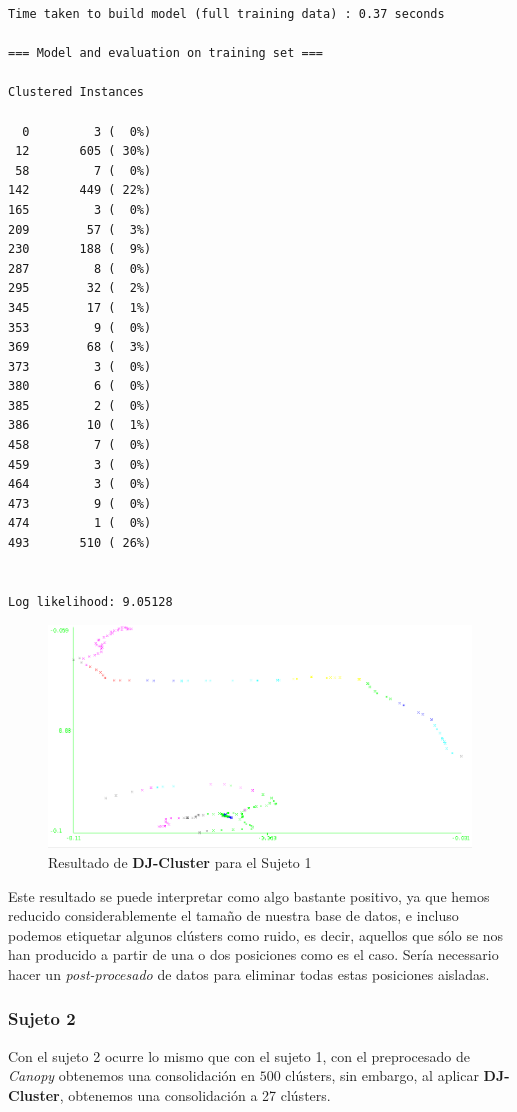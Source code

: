 \documentclass[a4paper, 12pt, spanish]{article}
\begin{document}
\begin{verbatim}
Time taken to build model (full training data) : 0.37 seconds

=== Model and evaluation on training set ===

Clustered Instances

  0         3 (  0%)
 12       605 ( 30%)
 58         7 (  0%)
142       449 ( 22%)
165         3 (  0%)
209        57 (  3%)
230       188 (  9%)
287         8 (  0%)
295        32 (  2%)
345        17 (  1%)
353         9 (  0%)
369        68 (  3%)
373         3 (  0%)
380         6 (  0%)
385         2 (  0%)
386        10 (  1%)
458         7 (  0%)
459         3 (  0%)
464         3 (  0%)
473         9 (  0%)
474         1 (  0%)
493       510 ( 26%)


Log likelihood: 9.05128
\end{verbatim}


\begin{figure}[H]
	\includegraphics[scale=.5]{../comparativa/djClusterSujeto1.png}
	\caption{Resultado de \textbf{DJ-Cluster} para el Sujeto 1}
\end{figure}

Este resultado se puede interpretar como algo bastante positivo, ya que hemos reducido considerablemente el tama\~no de nuestra base de datos, e incluso podemos etiquetar algunos cl\'usters como ruido, es decir, aquellos que s\'olo se nos han producido a partir de una o dos posiciones como es el caso. Ser\'ia necessario hacer un \textit{post-procesado} de datos para eliminar todas estas posiciones aisladas.

\subsubsection{Sujeto 2}

Con el sujeto 2 ocurre lo mismo que con el sujeto 1, con el preprocesado de \textit{Canopy} obtenemos una consolidaci\'on en $500$ cl\'usters, sin embargo, al aplicar \textbf{DJ-Cluster}, obtenemos una consolidaci\'on a 27 cl\'usters.\\
\end{document}
